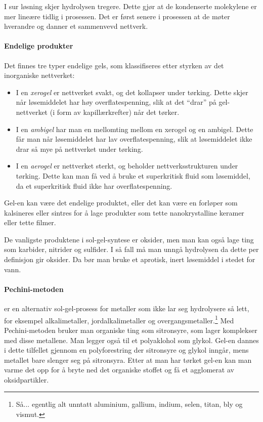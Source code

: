 I sur løsning skjer hydrolysen tregere. Dette gjør at de kondenserte molekylene er mer lineære tidlig i prosessen. Det er først senere i prosessen at de møter hverandre og danner et sammenvevd nettverk. 

\paragraph{Endelige produkter} Det finnes tre typer endelige gels, som klassifiseres etter styrken av det inorganiske nettverket:
\begin{itemize}
	\item I en \emph{xerogel} er nettverket svakt, og det kollapser under tørking. Dette skjer når løsemiddelet har høy overflatespenning, slik at det ``drar'' på gel-nettverket (i form av kapillærkrefter) når det tørker.
	\item I en \emph{ambigel} har man en mellomting mellom en xerogel og en ambigel. Dette får man når løsemiddelet har lav overflatespenning, slik at løsemiddelet ikke drar så mye på nettverket under tørking.
	\item I en \emph{aerogel} er nettverket sterkt, og beholder nettverksstrukturen under tørking. Dette kan man få ved å bruke et superkritisk fluid som løsemiddel, da et superkritisk fluid ikke har overflatespenning.
\end{itemize}
Gel-en kan være det endelige produktet, eller det kan være en forløper som kalsineres eller sintres for å lage produkter som tette nanokrystalline keramer eller tette filmer.

De vanligste produktene i sol-gel-syntese er oksider, men man kan også lage ting som karbider, nitrider og sulfider. I så fall må man unngå hydrolysen da dette per definisjon gir oksider. Da bør man bruke et aprotisk, inert løsemiddel i stedet for vann.


\paragraph{Pechini-metoden} er en alternativ sol-gel-prosess for metaller som ikke lar seg hydrolysere så lett, for eksempel alkalimetaller, jordalkalimetaller og overgangsmetaller.\footnote{Så... egentlig alt unntatt aluminium, gallium, indium, selen, titan, bly og vismut.} Med Pechini-metoden bruker man organiske ting som sitronsyre, som lager komplekser med disse metallene. Man legger også til et polyaklohol som glykol. Gel-en dannes i dette tilfellet gjennom en polyforestring der sitronsyre og glykol inngår, mens metallet bare slenger seg på sitronsyra. Etter at man har tørket gel-en kan man varme det opp for å bryte ned det organiske stoffet og få et agglomerat av oksidpartikler.

